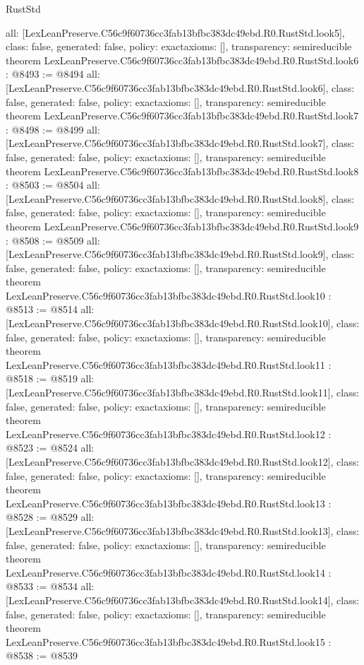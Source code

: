 \begin{lexlean}{RustStd}
\begin{coremodule}
{  all: [LexLeanPreserve.C56c9f60736cc3fab13bfbc383dc49ebd.R0.RustStd.look5],
  class: false,
  generated: false,
  policy: exact{axioms: []},
  transparency: semireducible
}
theorem LexLeanPreserve.C56c9f60736cc3fab13bfbc383dc49ebd.R0.RustStd.look6 : @8493 := @8494 {
  all: [LexLeanPreserve.C56c9f60736cc3fab13bfbc383dc49ebd.R0.RustStd.look6],
  class: false,
  generated: false,
  policy: exact{axioms: []},
  transparency: semireducible
}
theorem LexLeanPreserve.C56c9f60736cc3fab13bfbc383dc49ebd.R0.RustStd.look7 : @8498 := @8499 {
  all: [LexLeanPreserve.C56c9f60736cc3fab13bfbc383dc49ebd.R0.RustStd.look7],
  class: false,
  generated: false,
  policy: exact{axioms: []},
  transparency: semireducible
}
theorem LexLeanPreserve.C56c9f60736cc3fab13bfbc383dc49ebd.R0.RustStd.look8 : @8503 := @8504 {
  all: [LexLeanPreserve.C56c9f60736cc3fab13bfbc383dc49ebd.R0.RustStd.look8],
  class: false,
  generated: false,
  policy: exact{axioms: []},
  transparency: semireducible
}
theorem LexLeanPreserve.C56c9f60736cc3fab13bfbc383dc49ebd.R0.RustStd.look9 : @8508 := @8509 {
  all: [LexLeanPreserve.C56c9f60736cc3fab13bfbc383dc49ebd.R0.RustStd.look9],
  class: false,
  generated: false,
  policy: exact{axioms: []},
  transparency: semireducible
}
theorem LexLeanPreserve.C56c9f60736cc3fab13bfbc383dc49ebd.R0.RustStd.look10 : @8513 := @8514 {
  all: [LexLeanPreserve.C56c9f60736cc3fab13bfbc383dc49ebd.R0.RustStd.look10],
  class: false,
  generated: false,
  policy: exact{axioms: []},
  transparency: semireducible
}
theorem LexLeanPreserve.C56c9f60736cc3fab13bfbc383dc49ebd.R0.RustStd.look11 : @8518 := @8519 {
  all: [LexLeanPreserve.C56c9f60736cc3fab13bfbc383dc49ebd.R0.RustStd.look11],
  class: false,
  generated: false,
  policy: exact{axioms: []},
  transparency: semireducible
}
theorem LexLeanPreserve.C56c9f60736cc3fab13bfbc383dc49ebd.R0.RustStd.look12 : @8523 := @8524 {
  all: [LexLeanPreserve.C56c9f60736cc3fab13bfbc383dc49ebd.R0.RustStd.look12],
  class: false,
  generated: false,
  policy: exact{axioms: []},
  transparency: semireducible
}
theorem LexLeanPreserve.C56c9f60736cc3fab13bfbc383dc49ebd.R0.RustStd.look13 : @8528 := @8529 {
  all: [LexLeanPreserve.C56c9f60736cc3fab13bfbc383dc49ebd.R0.RustStd.look13],
  class: false,
  generated: false,
  policy: exact{axioms: []},
  transparency: semireducible
}
theorem LexLeanPreserve.C56c9f60736cc3fab13bfbc383dc49ebd.R0.RustStd.look14 : @8533 := @8534 {
  all: [LexLeanPreserve.C56c9f60736cc3fab13bfbc383dc49ebd.R0.RustStd.look14],
  class: false,
  generated: false,
  policy: exact{axioms: []},
  transparency: semireducible
}
theorem LexLeanPreserve.C56c9f60736cc3fab13bfbc383dc49ebd.R0.RustStd.look15 : @8538 := @8539 {
}
\end{coremodule}
\end{lexlean}
